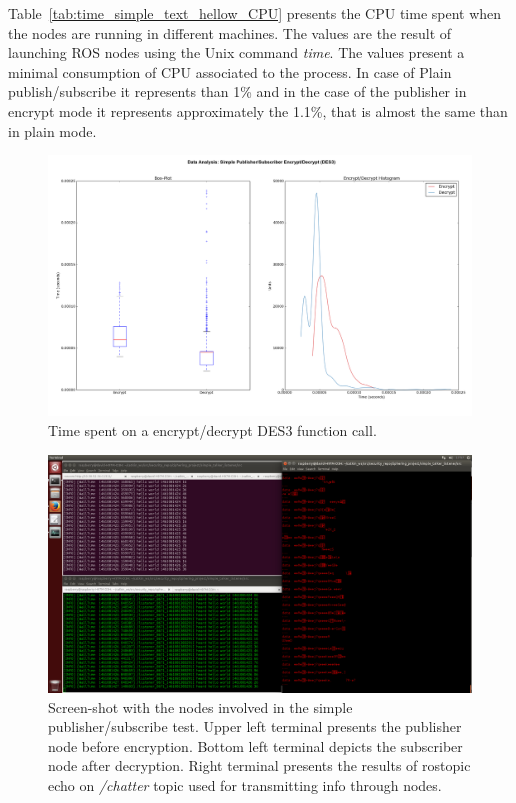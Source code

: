 \documentclass[journal,twoside]{JoPhA}
\begin{document}
Table~\ref{tab:time_simple_text_hellow_CPU} presents the CPU time spent when the nodes are running in different machines.  The values are the result of launching ROS nodes using the Unix command {\em time}. The values present a minimal consumption of CPU associated to the process. In  case of Plain publish/subscribe it represents than 1\% and in the case of the publisher in encrypt mode it represents approximately the 1.1\%, that is almost the same than in plain mode.


\begin{figure}[ht]
	\centering
	\includegraphics[width=.5\textwidth]{figure_Simple_Publisher_subscriber.png}
	\caption{Time spent on a encrypt/decrypt DES3 function call.}
	\label{fig:time_simple_text_CPU}
\end{figure}

\begin{figure}[ht!]
	\centering
	\includegraphics[width=.99\textwidth]{Screenshot_hello_world.png}
	\caption{Screen-shot with the nodes involved in the simple publisher/subscribe test. Upper left terminal presents the publisher node before encryption. Bottom left terminal depicts the subscriber node after decryption. Right terminal presents the results of rostopic echo on {\em /chatter} topic used for transmitting info through nodes.}
	\label{fig:screenshot_hello_world}
\end{figure}
\end{document}
